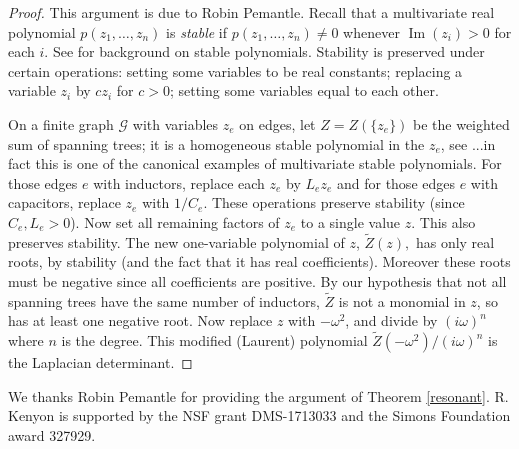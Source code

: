 \documentclass[12pt]{amsart}
\DeclareMathOperator{\Imaginary}{Im}
\renewcommand{\Im}{\Imaginary}
\newcommand{\G}{{\mathcal G}}
\begin{document}
\begin{proof}
This argument is due to Robin Pemantle.
Recall that a multivariate real polynomial $p(z_1,\dots,z_n)$ is \emph{stable} if $p(z_1,\dots,z_n)\ne 0$ whenever $\Im(z_i)>0$ for each $i$.
See \cite{Wagner2011} for background on stable polynomials.
Stability is preserved under certain operations: setting some variables to be real constants; replacing
a variable $z_i$ by $c z_i$ for $c>0$; setting some variables equal to each other. 

On a finite graph $\G$ with variables $z_e$ on edges, let $Z=Z(\{z_e\})$ be the weighted sum of spanning trees;
it is a homogeneous stable polynomial in the $z_e$, see \cite[Prop. 2.4]{Borcea2008}...in fact this is one of the canonical examples of multivariate stable polynomials.
For those edges $e$ with inductors, replace each $z_e$ by $L_e z_e$ and for
those edges $e$ with capacitors, replace $z_e$ with $1/C_e$. These operations preserve stability 
(since $C_e,L_e>0$). Now set all remaining
factors of $z_e$ to a single value $z$.
This also preserves stability. The new one-variable polynomial of $z$, $\tilde Z(z),$ has only real roots, by stability 
(and the fact that it has real coefficients). Moreover these roots must be negative
since all coefficients are positive. By our hypothesis that not all spanning trees have the same number of inductors, $\tilde Z$ is not a monomial in $z$, so has at least one negative root.
Now replace $z$ with $-\omega^2$, and divide by
$(i\omega)^{n}$ where $n$ is the  degree. This modified (Laurent) polynomial $\tilde Z(-\omega^2)/(i\omega)^n$ 
is the Laplacian determinant. 
\end{proof}

 We thanks Robin Pemantle for providing the argument of Theorem \ref{resonant}. R. Kenyon
is supported by the NSF grant DMS-1713033 and the Simons Foundation award 327929.



\end{document}
